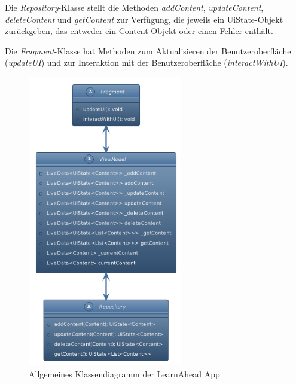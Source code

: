 \noindent
Die \textit{Repository}-Klasse stellt die Methoden \textit{addContent}, \textit{updateContent}, \textit{deleteContent} und \textit{getContent} zur Verfügung, die jeweils ein UiState-Objekt zurückgeben, das entweder ein Content-Objekt oder einen Fehler enthält.\newline

\noindent
Die \textit{Fragment}-Klasse hat Methoden zum Aktualisieren der Benutzeroberfläche (\textit{updateUI}) und zur Interaktion mit der Benutzeroberfläche (\textit{interactWithUI}).

\newpage
\begin{figure}[h]
\centering
\includegraphics[width=0.6\textwidth]{images/diagramme/Klassendiagramm.png}
\caption{Allgemeines Klassendiagramm der LearnAhead App}
\label{fig:klassendiagramm}
\end{figure}

\newpage
\clearpage
